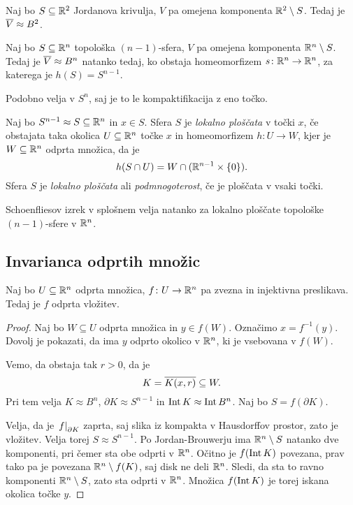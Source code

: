 \begin{izrek}[Schoenflies]
Naj bo $S \subseteq \mathbb{R}^2$ Jordanova krivulja, $V$ pa omejena
komponenta $\mathbb{R}^2 \setminus S$. Tedaj je $\overline{V} \approx B^2$.
\end{izrek}

\begin{trditev}
Naj bo $S \subseteq \mathbb{R}^n$ topološka $(n-1)$-sfera, $V$ pa omejena
komponenta $\mathbb{R}^n \setminus S$. Tedaj je $\overline{V} \approx B^n$
natanko tedaj, ko obstaja homeomorfizem $s \colon \mathbb{R}^n \to \mathbb{R}^n$,
za katerega je $h(S) = S^{n-1}$.
\end{trditev}

\begin{opomba}
Podobno velja v $S^n$, saj je to le kompaktifikacija z eno točko.
\end{opomba}

\begin{definicija}
Naj bo $S^{n-1} \approx S \subseteq \mathbb{R}^n$ in $x \in S$. Sfera $S$
je \emph{lokalno ploščata} v točki $x$, če obstajata taka okolica
$U \subseteq \mathbb{R}^n$ točke $x$ in homeomorfizem $h \colon U \to W$,
kjer je $W \subseteq \mathbb{R}^n$ odprta množica, da je
\[
h(S \cap U) = W \cap (\mathbb{R}^{n-1} \times \left\{0\right\}).
\]
Sfera $S$ je \emph{lokalno ploščata} ali
\emph{podmnogoterost}, če je
ploščata v vsaki točki.
\end{definicija}

\begin{opomba}
Schoenfliesov izrek v splošnem velja natanko za lokalno ploščate
topološke $(n-1)$-sfere v $\mathbb{R}^n$.
\end{opomba}

\newpage

\subsection{Invarianca odprtih množic}

\begin{izrek}[Brouwer]
Naj bo $U \subseteq \mathbb{R}^n$ odprta množica, $f \colon U \to \mathbb{R}^n$ pa
zvezna in injektivna preslikava. Tedaj je $f$ odprta vložitev.
\end{izrek}

\begin{proof}
Naj bo $W \subseteq U$ odprta množica in $y \in f(W)$. Označimo
$x = f^{-1}(y)$. Dovolj je pokazati, da ima $y$ odprto okolico v
$\mathbb{R}^n$, ki je vsebovana v $f(W)$.

Vemo, da obstaja tak $r > 0$, da je
\[
K = \overline{K(x,r)} \subseteq W.
\]
Pri tem velja $K \approx B^n$, $\partial K \approx S^{n-1}$ in
$\operatorname{Int} K \approx \operatorname{Int} B^n$. Naj bo $S = f(\partial K)$.

Velja, da je $\left. f\right|_{\partial K}^{}$ zaprta, saj slika iz kompakta
v Hausdorffov prostor, zato je vložitev. Velja torej
$S \approx S^{n-1}$. Po Jordan-Brouwerju ima $\mathbb{R}^n \setminus S$
natanko dve komponenti, pri čemer sta obe odprti v $\mathbb{R}^n$. Očitno
je $f(\operatorname{Int} K)$ povezana, prav tako pa je povezana
$\mathbb{R}^n \setminus f(K)$, saj disk ne deli $\mathbb{R}^n$. Sledi, da sta to
ravno komponenti $\mathbb{R}^n \setminus S$, zato sta odprti v $\mathbb{R}^n$.
Množica $f(\operatorname{Int} K)$ je torej iskana okolica točke $y$.
\end{proof}


